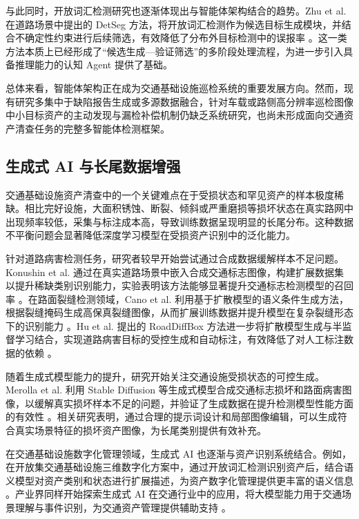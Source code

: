 与此同时，开放词汇检测研究也逐渐体现出与智能体架构结合的趋势。Zhu et al. 在道路场景中提出的 DetSeg 方法，将开放词汇检测作为候选目标生成模块，并结合不确定性约束进行后续筛选，有效降低了分布外目标检测中的误报率 \cite{zhu2025detseg}。这一类方法本质上已经形成了“候选生成—验证筛选”的多阶段处理流程，为进一步引入具备推理能力的认知 Agent 提供了基础。

总体来看，智能体架构正在成为交通基础设施巡检系统的重要发展方向。然而，现有研究多集中于缺陷报告生成或多源数据融合，针对车载或路侧高分辨率巡检图像中小目标资产的主动发现与漏检补偿机制仍缺乏系统研究，也尚未形成面向交通资产清查任务的完整多智能体检测框架。

\subsection{生成式 AI 与长尾数据增强}
交通基础设施资产清查中的一个关键难点在于受损状态和罕见资产的样本极度稀缺。相比完好设施，大面积锈蚀、断裂、倾斜或严重磨损等损坏状态在真实路网中出现频率较低，采集与标注成本高，导致训练数据呈现明显的长尾分布。这种数据不平衡问题会显著降低深度学习模型在受损资产识别中的泛化能力。

针对道路病害检测任务，研究者较早开始尝试通过合成数据缓解样本不足问题。Konushin et al. 通过在真实道路场景中嵌入合成交通标志图像，构建扩展数据集以提升稀缺类别识别能力，实验表明该方法能够显著提升交通标志检测模型的召回率 \cite{konushin2021syntheticsigns}。在路面裂缝检测领域，Cano et al. 利用基于扩散模型的语义条件生成方法，根据裂缝掩码生成高保真裂缝图像，从而扩展训练数据并提升模型在复杂裂缝形态下的识别能力 \cite{cano2024semanticdiffusion}。Hu et al. 提出的 RoadDiffBox 方法进一步将扩散模型生成与半监督学习结合，实现道路病害目标的受控生成和自动标注，有效降低了对人工标注数据的依赖 \cite{hu2025roaddiffbox}。

随着生成式模型能力的提升，研究开始关注交通设施受损状态的可控生成。Merolla et al. 利用 Stable Diffusion 等生成式模型合成交通标志损坏和路面病害图像，以缓解真实损坏样本不足的问题，并验证了生成数据在提升检测模型性能方面的有效性 \cite{merolla2024signsurfacedamage}。相关研究表明，通过合理的提示词设计和局部图像编辑，可以生成符合真实场景特征的损坏资产图像，为长尾类别提供有效补充。

在交通基础设施数字化管理领域，生成式 AI 也逐渐与资产识别系统结合。例如，在开放集交通基础设施三维数字化方案中，通过开放词汇检测识别资产后，结合语义模型对资产类别和状态进行扩展描述，为资产数字化管理提供更丰富的语义信息 \cite{CN120125811A}。产业界同样开始探索生成式 AI 在交通行业中的应用，将大模型能力用于交通场景理解与事件识别，为交通资产管理提供辅助支持 \cite{7its2024trafficAImodel}。

